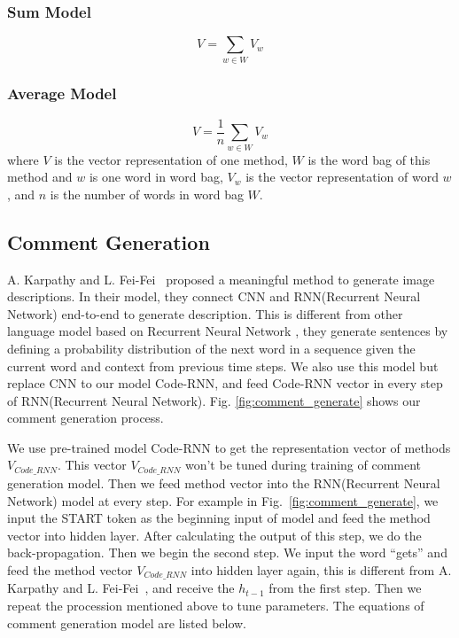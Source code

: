 \subsubsection{Sum Model}
\begin{equation}
V = \sum_{w \in W}{V_{w}}
\end{equation}

\subsubsection{Average Model}

\begin{equation}
V = \frac{1}{n}\sum_{w \in W}{V_{w}}
\end{equation}
where $V$ is the vector representation of one method, $W$ is the word bag of this method and $w$ is one word in word bag, $V_{w}$ is the vector representation of word $w$, and $n$ is the number of words in word bag $W$.



\subsection{Comment Generation}
A. Karpathy and L. Fei-Fei~\cite{karpathy2015deep} proposed a meaningful method to generate image descriptions. In their model, they connect CNN and RNN(Recurrent Neural Network) end-to-end to generate description. This is different from other language model based on Recurrent Neural Network \cite{elman1990finding}\cite{sutskever2011generating}\cite{mikolov2010recurrent}, they generate sentences by defining a probability distribution of the next word in a sequence given the current word and context from previous time steps. We also use this model but replace CNN to our model Code-RNN, and feed Code-RNN vector in every step of RNN(Recurrent Neural Network). Fig. \ref{fig:comment_generate} shows our comment generation process.

We use pre-trained model Code-RNN to get the representation vector of methods $V_{Code\_RNN}$. This vector $V_{Code\_RNN}$ won't be tuned during training of comment generation model. Then we feed method vector into the RNN(Recurrent Neural Network) model at every step. For example in Fig.~\ref{fig:comment_generate}, we input the START token as the beginning input of model and feed the method vector into hidden layer. After calculating the output of this step, we do the back-propagation. Then we begin the second step. We input the word ``gets'' and feed the method vector $V_{Code\_RNN}$ into hidden layer again, this is different from A. Karpathy and L. Fei-Fei~\cite{karpathy2015deep}, and receive the $h_{t-1}$ from the first step. Then we repeat the procession mentioned above to tune parameters. The equations of comment generation model are listed below.

